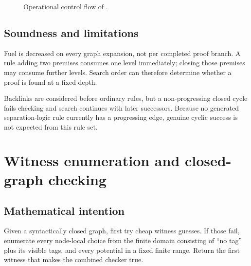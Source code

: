\documentclass[11pt,oneside]{book}
\DeclareRobustCommand{\code}[1]{\texttt{\detokenize{#1}}}
\newcommand{\mathintent}{\subsection*{Mathematical intention}}
\newcommand{\soundlim}{\subsection*{Soundness and limitations}}
\begin{document}
\begin{figure}[t]
\centering
{}
\caption{Operational control flow of \code{bounded_graph_search_from}.}
\label{fig:dfs}
\end{figure}

\soundlim

Fuel is decreased on every graph expansion, not per completed proof branch.
A rule adding two premises consumes one level immediately; closing those
premises may consume further levels.  Search order can therefore determine
whether a proof is found at a fixed depth.

Backlinks are considered before ordinary rules, but a non-progressing closed
cycle fails checking and search continues with later successors.  Because no
generated separation-logic rule currently has a progressing edge, genuine
cyclic success is not expected from this rule set.

\section{Witness enumeration and closed-graph checking}

\mathintent

Given a syntactically closed graph, first try cheap witness guesses.  If those
fail, enumerate every node-local choice from the finite domain consisting of
``no tag'' plus its visible tags, and every potential in a fixed finite range.
Return the first witness that makes the combined checker true.
\end{document}
